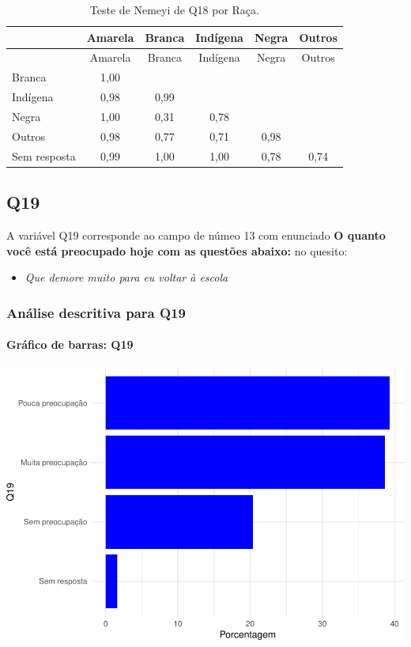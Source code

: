 \documentclass[]{article}
\providecommand{\tightlist}{%
  \setlength{\itemsep}{0pt}\setlength{\parskip}{0pt}}
\let\oldparagraph\paragraph
\renewcommand{\paragraph}[1]{\oldparagraph{#1}\mbox{}}
\begin{document}
\begin{longtable}[]{@{}lccccc@{}}
\caption{\label{tab:unnamed-chunk-246}Teste de Nemeyi de Q18 por Raça.}\tabularnewline
\toprule
& Amarela & Branca & Indígena & Negra & Outros\tabularnewline
\midrule
\endfirsthead
\toprule
& Amarela & Branca & Indígena & Negra & Outros\tabularnewline
\midrule
\endhead
Branca & 1,00 & & & &\tabularnewline
Indígena & 0,98 & 0,99 & & &\tabularnewline
Negra & 1,00 & 0,31 & 0,78 & &\tabularnewline
Outros & 0,98 & 0,77 & 0,71 & 0,98 &\tabularnewline
Sem resposta & 0,99 & 1,00 & 1,00 & 0,78 & 0,74\tabularnewline
\bottomrule
\end{longtable}

\cleardoublepage

\hypertarget{q19}{%
\subsection{Q19}\label{q19}}

A variável Q19 corresponde ao campo de númeo 13 com enunciado \textbf{O quanto você está preocupado hoje com as questões abaixo:} no quesito:

\begin{itemize}
\tightlist
\item
  \emph{Que demore muito para eu voltar à escola}
\end{itemize}

\hypertarget{anuxe1lise-descritiva-para-q19}{%
\subsubsection{Análise descritiva para Q19}\label{anuxe1lise-descritiva-para-q19}}

\hypertarget{gruxe1fico-de-barras-q19}{%
\paragraph{Gráfico de barras: Q19}\label{gruxe1fico-de-barras-q19}}

\begin{center}\includegraphics[width=0.75\linewidth]{relatorio_files/figure-latex/unnamed-chunk-247-1} \end{center}
\end{document}
